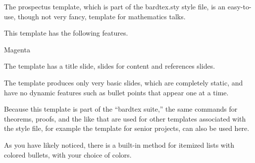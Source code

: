 \documentclass[12pt, oneside, reqno]{article}
\begin{document}


\startmain


The prospectus template, which is part of the \textsf{bardtex.sty} style file, is an easy-to-use, though not very fancy, template for mathematics talks.

This template has the following features.

\begin{itemizecp}{Magenta}
\item 
The template has a title slide, slides for content and references slides.

\item
The template produces only very basic slides, which are completely static, and have no dynamic features such as bullet points that appear one at a time.

\item
Because this template is part of the ``bardtex suite,'' the same commands for theorems, proofs, and the like that are used for other templates associated with the style file, for example the template for senior projects, can also be used here.

\item
As you have likely noticed, there is a built-in method for itemized lists with colored bullets, with your choice of colors. 
\end{itemizecp}


\end{document}
